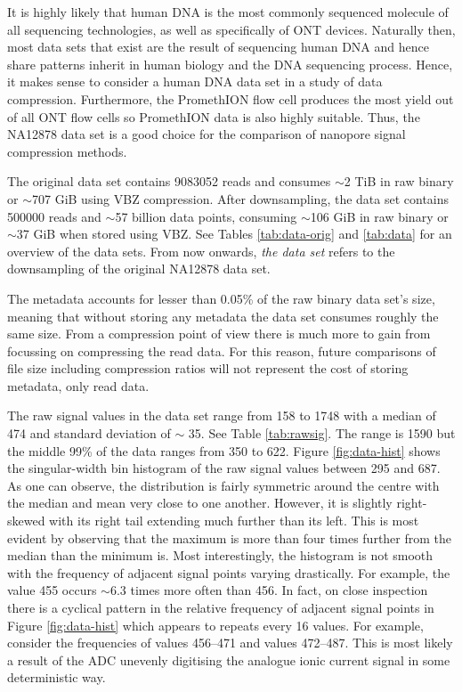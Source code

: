 It is highly likely that human DNA is the most commonly sequenced molecule of all sequencing technologies, as well as specifically of ONT devices.
Naturally then, most data sets that exist are the result of sequencing human DNA and hence share patterns inherit in human biology and the DNA sequencing process.
Hence, it makes sense to consider a human DNA data set in a study of data compression.
Furthermore, the PromethION flow cell produces the most yield out of all ONT flow cells so PromethION data is also highly suitable.
Thus, the NA12878 data set is a good choice for the comparison of nanopore signal compression methods.

The original data set contains \num{9083052} reads and consumes $\sim$2 TiB in raw binary or $\sim$707 GiB using VBZ compression. After downsampling, the data set contains \num{500000} reads and $\sim$57 billion data points, consuming $\sim$106 GiB in raw binary or $\sim$37 GiB when stored using VBZ. See Tables \ref{tab:data-orig} and \ref{tab:data} for an overview of the data sets. From now onwards, \textit{the data set} refers to the downsampling of the original NA12878 data set.




The metadata accounts for lesser than 0.05\% of the raw binary data set's size, meaning that without storing any metadata the data set consumes roughly the same size. From a compression point of view there is much more to gain from focussing on compressing the read data. For this reason, future comparisons of file size including compression ratios will not represent the cost of storing metadata, only read data.

The raw signal values in the data set range from 158 to 1748 with a median of 474 and standard deviation of $\sim$ 35. See Table \ref{tab:rawsig}. The range is 1590 but the middle 99\% of the data ranges from 350 to 622. Figure \ref{fig:data-hist} shows the singular-width bin histogram of the raw signal values between 295 and 687.
As one can observe, the distribution is fairly symmetric around the centre with the median and mean very close to one another. However, it is slightly right-skewed with its right tail extending much further than its left. This is most evident by observing that the maximum is more than four times further from the median than the minimum is.
Most interestingly, the histogram is not smooth with the frequency of adjacent signal points varying drastically. For example, the value 455 occurs $\sim$6.3 times more often than 456.
In fact, on close inspection there is a cyclical pattern in the relative frequency of adjacent signal points in Figure \ref{fig:data-hist} which appears to repeats every 16 values. For example, consider the frequencies of values 456--471 and values 472--487.
This is most likely a result of the ADC unevenly digitising the analogue ionic current signal in some deterministic way.


